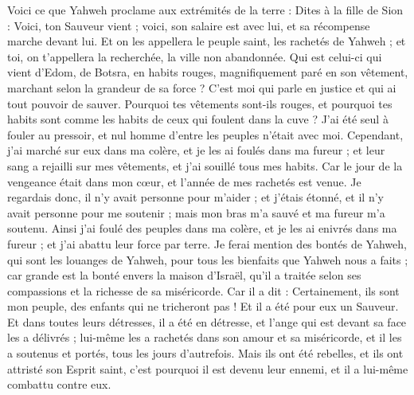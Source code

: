 \begin{multicols}{2}
Voici ce que Yahweh proclame aux extrémités de la terre : Dites à la fille de Sion : Voici, ton Sauveur vient ; voici, son salaire est avec lui, et sa récompense marche devant lui.
Et on les appellera le peuple saint, les rachetés de Yahweh ; et toi, on t'appellera la recherchée, la ville non abandonnée.
\VerseOne{}Qui est celui-ci qui vient d'Edom, de Botsra, en habits rouges, magnifiquement paré en son vêtement, marchant selon la grandeur de sa force ? C'est moi qui parle en justice et qui ai tout pouvoir de sauver.
Pourquoi tes vêtements sont-ils rouges, et pourquoi tes habits sont comme les habits de ceux qui foulent dans la cuve ?
J'ai été seul à fouler au pressoir, et nul homme d'entre les peuples n'était avec moi. Cependant, j'ai marché sur eux dans ma colère, et je les ai foulés dans ma fureur ; et leur sang a rejailli sur mes vêtements, et j'ai souillé tous mes habits.
Car le jour de la vengeance était dans mon cœur, et l'année de mes rachetés est venue.
Je regardais donc, il n'y avait personne pour m'aider ; et j'étais étonné, et il n'y avait personne pour me soutenir ; mais mon bras m'a sauvé et ma fureur m'a soutenu.
Ainsi j'ai foulé des peuples dans ma colère, et je les ai enivrés dans ma fureur ; et j'ai abattu leur force par terre.
Je ferai mention des bontés de Yahweh, qui sont les louanges de Yahweh, pour tous les bienfaits que Yahweh nous a faits ; car grande est la bonté envers la maison d'Israël, qu'il a traitée selon ses compassions et la richesse de sa miséricorde.
Car il a dit : Certainement, ils sont mon peuple, des enfants qui ne tricheront pas ! Et il a été pour eux un Sauveur.
Et dans toutes leurs détresses, il a été en détresse, et l'ange qui est devant sa face les a délivrés ; lui-même les a rachetés dans son amour et sa miséricorde, et il les a soutenus et portés, tous les jours d'autrefois.
Mais ils ont été rebelles, et ils ont attristé son Esprit saint, c'est pourquoi il est devenu leur ennemi, et il a lui-même combattu contre eux.

\end{multicols}
